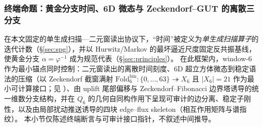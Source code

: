 \subsubsection{终端命题：黄金分支时间、6D 微态与 Zeckendorf--GUT 的离散三分支}
\label{subsubsec:window6-terminal-propositions}

在本文固定的单生成扫描—二元窗读出协议下，“时间”被定义为\emph{单生成扫描算子}的迭代计数（\S\ref{sec:spg}），并以 Hurwitz/Markov 的最坏逼近尺度固定反共振基线，使黄金分支 \(\alpha=\varphi^{-1}\) 成为规范代表（\S\ref{sec:principles}）。
在此框架内，window-\(6\) 作为最小锚点同时控制：二元窗读出的离散时间刻度、6D 超立方体微态到稳定语法的压缩（以 Zeckendorf 截窗满射 \(\mathrm{Fold}^{\mathrm{bin}}_6:\{0,\dots,63\}\twoheadrightarrow X_6\) 且 \(|X_6|=21\) 作为最小可计算接口；见 \cite{Internal2025ResolutionFoldingPhiPi}）、由 uplift 尾部偏移与 Zeckendorf--Fibonacci 边界塔诱导的统一维数分支结构，并在 \(Q_6\) 的几何自同构作用下呈现可审计的边分离、稳定子刚性，以及由局部扰动推送诱导的四块 edge--flux skeleton（相互作用矩阵与谱指纹）。
本小节仅陈述终端断言与可审计接口指针，不叙述中间推导。

